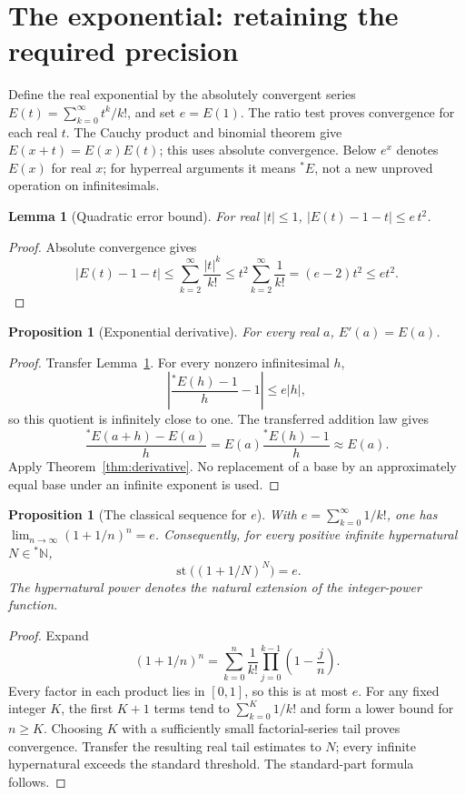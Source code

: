 \documentclass[11pt]{article}
\newtheorem{proposition}[theorem]{Proposition}
\newtheorem{lemma}[theorem]{Lemma}
\theoremstyle{definition}
\theoremstyle{remark}
\newcommand{\NN}{\mathbb N}
\newcommand{\ext}[1]{{}^{*}\!#1}
\DeclareMathOperator{\st}{st}
\begin{document}
\section{The exponential: retaining the required precision}
Define the real exponential by the absolutely convergent series
\(E(t)=\sum_{k=0}^{\infty}t^k/k!\), and set \(e=E(1)\).
The ratio test proves convergence for each real \(t\). The Cauchy product and
binomial theorem give \(E(x+t)=E(x)E(t)\); this uses absolute convergence.
Below \(e^x\) denotes \(E(x)\) for real \(x\); for hyperreal arguments it means
\(\ext E\), not a new unproved operation on infinitesimals.
\begin{lemma}[Quadratic error bound]\label{lem:exp-error}
For real \(|t|\le1\), \(|E(t)-1-t|\le e\,t^2\).
\end{lemma}
\begin{proof}
Absolute convergence gives
\[
|E(t)-1-t|\le\sum_{k=2}^{\infty}\frac{|t|^k}{k!}
\le t^2\sum_{k=2}^{\infty}\frac1{k!}=(e-2)t^2\le e t^2.
\]
\end{proof}
\begin{proposition}[Exponential derivative]\label{prop:exp-derivative}
For every real \(a\), \(E'(a)=E(a)\).
\end{proposition}
\begin{proof}
Transfer Lemma~\ref{lem:exp-error}. For every nonzero infinitesimal \(h\),
\[
\left|\frac{\ext E(h)-1}{h}-1\right|\le e|h|,
\]
so this quotient is infinitely close to one. The transferred addition law gives
\[
\frac{\ext E(a+h)-E(a)}h
=E(a)\frac{\ext E(h)-1}h\approx E(a).
\]
Apply Theorem~\ref{thm:derivative}. No replacement of a base by an approximately
equal base under an infinite exponent is used.
\end{proof}
\begin{proposition}[The classical sequence for \(e\)]\label{prop:e-sequence}
With \(e=\sum_{k=0}^{\infty}1/k!\), one has
\(\lim_{n\to\infty}(1+1/n)^n=e\). Consequently, for every positive infinite
hypernatural \(N\in\ext\NN\),
\[
\st\big((1+1/N)^N\big)=e.
\]
The hypernatural power denotes the natural extension of the integer-power function.
\end{proposition}
\begin{proof}
Expand
\[
(1+1/n)^n=\sum_{k=0}^n\frac1{k!}
 \prod_{j=0}^{k-1}\left(1-\frac jn\right).
\]
Every factor in each product lies in \([0,1]\), so this is at most \(e\).
For any fixed integer \(K\), the first \(K+1\) terms tend to
\(\sum_{k=0}^K1/k!\) and form a lower bound for \(n\ge K\).
Choosing \(K\) with a sufficiently small factorial-series tail proves convergence.
Transfer the resulting real tail estimates to \(N\); every infinite hypernatural
exceeds the standard threshold. The standard-part formula follows.
\end{proof}
\end{document}
